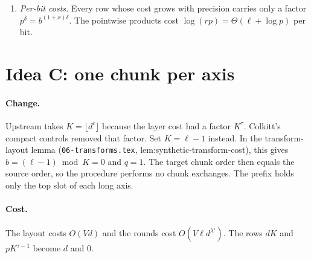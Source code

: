 \documentclass[11pt]{article}
\theoremstyle{remark}\newtheorem*{remark}{Remark}
\begin{document}
\begin{enumerate}
lemma needs $\log x>8d$, which fails for $\epsilon\ge1/2$. Replace it with the prime number theorem. Each interval has length $\eta x=x/(4dL^y)=x/(\log x)^{O(1)}$, so the classical prime number theorem with error term $O(x\exp(-c\sqrt{\log x}))$ already gives more than $d$ primes in each interval for every fixed $\epsilon<1$, with effective constants. The machine only needs existence; it scans and tests by trial division in $n^{o(1)}$ time, since the log of the scan length is $O(\log p+L/d)=o(L)$.
\item \emph{Per-bit costs.} Every row whose cost grows with precision carries only a factor
$p^\delta=b^{(1+x)\delta}$. The pointwise products cost $\log(rp)=\Theta(\ell+\log p)$ per bit.
\end{enumerate}

\section{Idea C: one chunk per axis}

\paragraph{Change.} Upstream takes $K=\lfloor d^c\rfloor$ because the layer cost had a factor
$K^\tau$. Colkitt's compact controls removed that factor. Set $K=\ell-1$ instead. In the
transform-layout lemma (\texttt{06-transforms.tex}, lem:synthetic-transform-cost), this gives
$b=(\ell-1)\bmod K=0$ and $q=1$. The target chunk order then equals the source order, so the
procedure performs no chunk exchanges. The prefix holds only the top slot of each long axis.

\paragraph{Cost.} The layout costs $O(V d)$ and the rounds cost
$O(V\ell d^{\lambda'})$. The rows $dK$ and $pK^{\tau-1}$ become $d$ and $0$.
\end{document}

